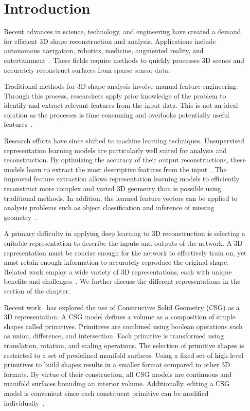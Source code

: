 
\chapter{Introduction}
\label{chap:introduction}

Recent advances in science, technology, and engineering have created a demand for efficient 3D shape reconstruction and analysis. Applications include autonomous navigation, robotics, medicine, augmented reality, and entertainment~\cite{Xiao2020, Xie2022}. These fields require methods to quickly processes 3D scenes and accurately reconstruct surfaces from sparse sensor data.

Traditional methods for 3D shape analysis involve manual feature engineering. Through this process, researchers apply prior knowledge of the problem to identify and extract relevant features from the input data. This is not an ideal solution as the processes is time consuming and overlooks potentially useful features~\cite{Bengio2013}.

Research efforts have since shifted to machine learning techniques. Unsupervised representation learning models are particularly well suited for analysis and reconstruction. By optimizing the accuracy of their output reconstructions, these models learn to extract the most descriptive features from the input~\cite{Bengio2013}. The improved feature extraction allows representation learning models to efficiently reconstruct more complex and varied 3D geometry than is possible using traditional methods. In addition, the learned feature vectors can be applied to analysis problems such as object classification and inference of missing geometry~\cite{Park2019}.

A primary difficulty in applying deep learning to 3D reconstruction is selecting a suitable representation to describe the inputs and outputs of the network. A 3D representation must be concise enough for the network to effectively train on, yet must retain enough information to accurately reproduce the original shape. Related work employ a wide variety of 3D representations, each with unique benefits and challenges~\cite{Xiao2020}. We further discuss the different representations in the  section of the  chapter.

Recent work~\cite{Sharma2018, Kania2020, Ren2021} has explored the use of Constructive Solid Geometry (CSG) as a 3D representation. A CSG model defines a volume as a composition of simple shapes called primitives. Primitives are combined using boolean operations such as union, difference, and intersection. Each primitive is transformed using translation, rotation, and scaling operations. The selection of primitive shapes is restricted to a set of predefined manifold surfaces. Using a fixed set of high-level primitives to build shapes results in a smaller format compared to other 3D formats. By virtue of their construction, all CSG models are continuous and manifold surfaces bounding an interior volume. Additionally, editing a CSG model is convenient since each constituent primitive can be modified individually~\cite{Hughes2013}.

